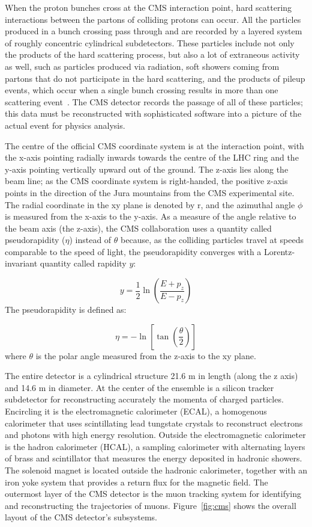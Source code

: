 When the proton bunches cross at the CMS interaction point, hard scattering interactions between the partons of colliding protons can occur. All the particles produced in a bunch crossing pass through and are recorded by a layered system of roughly concentric cylindrical subdetectors. These particles include not only the products of the hard scattering process, but also a lot of extraneous activity as well, such as particles produced via radiation, soft showers coming from partons that do not participate in the hard scattering, and the products of pileup events, which occur when a single bunch crossing results in more than one scattering event~\cite{Sjostrand:2006za}. The CMS detector records the passage of all of these particles; this data must be reconstructed with sophisticated software into a picture of the actual event for physics analysis.

The centre of the official CMS coordinate system is at the interaction point, with the x-axis pointing radially inwards towards the centre of the LHC ring and the y-axis pointing vertically upward out of the ground. The z-axis lies along the beam line; as the CMS coordinate system is right-handed, the positive z-axis points in the direction of the Jura mountains from the CMS experimental site. The radial coordinate in the xy plane is denoted by r, and the azimuthal angle $\phi$ is measured from the x-axis to the y-axis. As a measure of the angle relative to the beam axis (the z-axis), the CMS collaboration uses a quantity called pseudorapidity ($\eta$) instead of $\theta$ because, as the colliding particles travel at speeds comparable to the speed of light, the pseudorapidity converges with a Lorentz-invariant quantity called rapidity $y$:

\begin{equation}
y = \frac{1}{2}\ln(\frac{E+p_{z}}{E-p_{z}})
\label{eq:rapidity}
\end{equation}
The pseudorapidity is defined as:

\begin{equation}
\eta = -\ln[\tan(\frac{\theta}{2})]
\label{eq:pseudorapidity}
\end{equation}
where $\theta$ is the polar angle measured from the z-axis to the xy plane.

The entire detector is a cylindrical structure 21.6 m in length (along the z axis) and 14.6 m in diameter. At the center of the ensemble is a silicon tracker subdetector for reconstructing accurately the momenta of charged particles. Encircling it is the electromagnetic calorimeter (ECAL), a homogenous calorimeter that uses scintillating lead tungstate crystals to reconstruct electrons and photons with high energy resolution. Outside the electromagnetic calorimeter is the hadron calorimeter (HCAL), a sampling calorimeter with alternating layers of brass and scintillator that measures the energy deposited in hadronic showers. The solenoid magnet is located outside the hadronic calorimeter, together with an iron yoke system that provides a return flux for the magnetic field. The outermost layer of the CMS detector is the muon tracking system for identifying and reconstructing the trajectories of muons. Figure~\ref{fig:cms} shows the overall layout of the CMS detector's subsystems.

